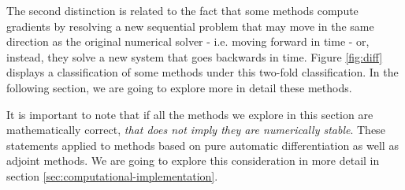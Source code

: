 The second distinction is related to the fact that some methods compute gradients by resolving a new sequential problem that may move in the same direction as the original numerical solver - i.e. moving forward in time - or, instead, they solve a new system that goes backwards in time. 
Figure \ref{fig:diff} displays a classification of some methods under this two-fold classification. In the following section, we are going to explore more in detail these methods.

It is important to note that if all the methods we explore in this section are mathematically correct, \textit{that does not imply they are numerically stable}.
These statements applied to methods based on pure automatic differentiation as well as adjoint methods. 
We are going to explore this consideration in more detail in section \ref{sec:computational-implementation}.